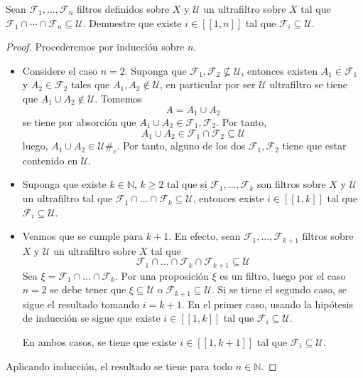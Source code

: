 \documentclass[12pt]{report}
\theoremstyle{largebreak}
\newcommand\contradiction{\ensuremath{\#_c}}
\newcommand\natint[1]{\ensuremath{\left[\!\left[#1\right]\!\right] }}
\begin{document}
    \begin{excer}
        Sean $\mathcal{F}_1,...,\mathcal{F}_n$ filtros definidos sobre $X$ y $\mathcal{U}$ un ultrafiltro sobre $X$ tal que $\mathcal{F}_1\cap \cdots\cap \mathcal{F}_n\subseteq\mathcal{U}$. Demuestre que existe $i\in\natint{1,n}$ tal que $\mathcal{F}_i\subseteq\mathcal{U}$.
    \end{excer}

    \begin{proof}
        Procederemos por inducción sobre $n$.
        \begin{itemize}
            \item Considere el caso $n=2$. Suponga que $\mathcal{F}_1,\mathcal{F}_2\nsubseteq\mathcal{U}$, entonces existen $A_1\in\mathcal{F}_1$ y $A_2\in\mathcal{F}_2$ tales que $A_1,A_2\notin\mathcal{U}$, en particular por ser $\mathcal{U}$ ultrafiltro se tiene que $A_1\cup A_2\notin\mathcal{U}$. Tomemos
            \begin{equation*}
                A=A_1\cup A_2
            \end{equation*}
            se tiene por absorción que $A_1\cup A_2 \in\mathcal{F}_1,\mathcal{F}_2$. Por tanto,
            \begin{equation*}
                A_1\cup A_2\in\mathcal{F}_1\cap\mathcal{F}_2\subseteq\mathcal{U}
            \end{equation*}
            luego, $A_1\cup A_2\in\mathcal{U}$\contradiction. Por tanto, alguno de los dos $\mathcal{F}_1,\mathcal{F}_2$ tiene que estar contenido en $\mathcal{U}$.
            \item Suponga que existe $k\in\mathbb{N}$, $k\geq 2$ tal que si $\mathcal{F}_1,...,\mathcal{F}_k$ son filtros sobre $X$ y $\mathcal{U}$ un ultrafiltro tal que $\mathcal{F}_1\cap...\cap\mathcal{F}_k\subseteq\mathcal{U}$, entonces existe $i\in\natint{1,k}$ tal que $\mathcal{F}_i\subseteq\mathcal{U}$.
            \item Veamos que se cumple para $k+1$. En efecto, sean $\mathcal{F}_1,...,\mathcal{F}_{ k+1}$ filtros sobre $X$ y $\mathcal{U}$ un ultrafiltro sobre $X$ tal que
            \begin{equation*}
                \mathcal{F}_1\cap...\cap\mathcal{F}_k\cap\mathcal{F}_{ k+1}\subseteq\mathcal{U}
            \end{equation*}
            Sea $\xi=\mathcal{F}_1\cap...\cap\mathcal{F}_k$. Por una proposición $\xi$ es un filtro, luego por el caso $n=2$ se debe tener que $\xi\subseteq\mathcal{U}$ o $\mathcal{F}_{ k+1}\subseteq\mathcal{U}$. Si se tiene el segundo caso, se sigue el resultado tomando $i=k+1$. En el primer caso, usando la hipótesis de inducción se sigue que existe $i\in\natint{1,k}$ tal que $\mathcal{F}_i\subseteq\mathcal{U}$.

            En ambos casos, se tiene que existe $i\in\natint{1,k+1}$ tal que $\mathcal{F}_i\subseteq\mathcal{U}$.
        \end{itemize}
        Aplicando inducción, el resultado se tiene para todo $n\in\mathbb{N}$.
    \end{proof}
\end{document}
